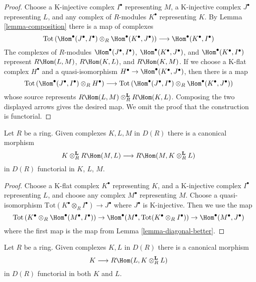 \begin{proof}
Choose a K-injective complex $I^\bullet$ representing $M$,
a K-injective complex $J^\bullet$ representing $L$, and
any complex of $R$-modules $K^\bullet$ representing $K$.
By Lemma \ref{lemma-composition} there is a map of complexes
$$
\text{Tot}\left(
\Hom^\bullet(J^\bullet, I^\bullet) \otimes_R \Hom^\bullet(K^\bullet, J^\bullet)
\right)
\longrightarrow
\Hom^\bullet(K^\bullet, I^\bullet)
$$
The complexes of $R$-modules $\Hom^\bullet(J^\bullet, I^\bullet)$,
$\Hom^\bullet(K^\bullet, J^\bullet)$, and $\Hom^\bullet(K^\bullet, I^\bullet)$
represent $R\Hom(L, M)$, $R\Hom(K, L)$, and $R\Hom(K, M)$.
If we choose a K-flat complex $H^\bullet$ and a quasi-isomorphism
$H^\bullet \to \Hom^\bullet(K^\bullet, J^\bullet)$, then there is a map
$$
\text{Tot}\left(
\Hom^\bullet(J^\bullet, I^\bullet) \otimes_R H^\bullet
\right)
\longrightarrow
\text{Tot}\left(
\Hom^\bullet(J^\bullet, I^\bullet) \otimes_R \Hom^\bullet(K^\bullet, J^\bullet)
\right)
$$
whose source represents $R\Hom(L, M) \otimes_R^\mathbf{L} R\Hom(K, L)$.
Composing the two displayed arrows gives the desired map. We omit the
proof that the construction is functorial.
\end{proof}

\begin{lemma}
\label{lemma-internal-hom-diagonal-better}
Let $R$ be a ring. Given complexes $K, L, M$ in $D(R)$
there is a canonical morphism
$$
K \otimes_R^\mathbf{L} R\Hom(M, L)
\longrightarrow
R\Hom(M, K \otimes_R^\mathbf{L} L)
$$
in $D(R)$ functorial in $K$, $L$, $M$.
\end{lemma}

\begin{proof}
Choose a K-flat complex $K^\bullet$ representing $K$,
and a K-injective complex $I^\bullet$ representing $L$, and
choose any complex $M^\bullet$ representing $M$.
Choose a quasi-isomorphism
$\text{Tot}(K^\bullet \otimes_R I^\bullet) \to J^\bullet$
where $J^\bullet$ is K-injective. Then we use the map
$$
\text{Tot}\left(
K^\bullet \otimes_R \Hom^\bullet(M^\bullet, I^\bullet)
\right)
\to
\Hom^\bullet(M^\bullet, \text{Tot}(K^\bullet \otimes_R I^\bullet))
\to
\Hom^\bullet(M^\bullet, J^\bullet)
$$
where the first map is the map from Lemma \ref{lemma-diagonal-better}.
\end{proof}

\begin{lemma}
\label{lemma-internal-hom-diagonal}
Let $R$ be a ring. Given complexes $K, L$ in $D(R)$
there is a canonical morphism
$$
K \longrightarrow R\Hom(L, K \otimes_R^\mathbf{L} L)
$$
in $D(R)$ functorial in both $K$ and $L$.
\end{lemma}

